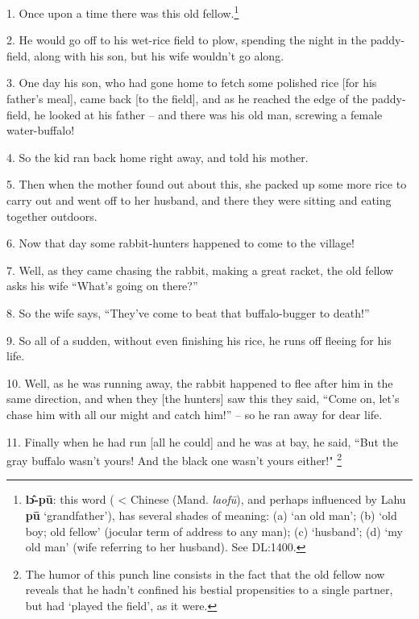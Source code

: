 \setcounter{footnote}{0}

1. Once upon a time there was this old fellow.\footnote{\textbf{lɔ̂-pū}: this word ( < Chinese  (Mand. \textit{laofū}), and perhaps influenced by Lahu \textbf{pū} `grandfather'), has several shades of meaning: (a) `an old man'; (b) `old boy; old fellow' (jocular term of address to any man); (c) `husband'; (d) `my old man' (wife referring to her husband). See DL:1400.}

2. He would go off to his wet-rice field to plow, spending the night in the paddy-field,
along with his son, but his wife wouldn't go along.

3. One day his son, who had gone home to fetch some polished rice [for his father's
meal], came back [to the field], and as he reached the edge of the paddy-field,
he looked at his father -- and there was his old man, screwing a female water-buffalo!

4. So the kid ran back home right away, and told his mother.

5. Then when the mother found out about this, she packed up some more rice to carry
out and went off to her husband, and there they were sitting and eating together
outdoors.

6. Now that day some rabbit-hunters happened to come to the village!

7. Well, as they came chasing the rabbit, making a great racket, the old fellow
asks his wife ``What's going on there?''

8. So the wife says, ``They've come to beat that buffalo-bugger to death!''

9. So all of a sudden, without even finishing his rice, he runs off fleeing for
his life.

10. Well, as he was running away, the rabbit happened to flee after him in the
same direction, and when they [the hunters] saw this they said, ``Come
on, let's chase him with all our might and catch him!'' -- so he ran away
for dear life.

11. Finally when he had run [all he could] and he was at bay, he said, ``But
the gray buffalo wasn't yours! And the black one wasn't yours either!"
\footnote{The humor of this punch line consists in the fact that the old fellow now reveals that he hadn't confined his bestial propensities to a single partner, but had `played the field', as it were.}

